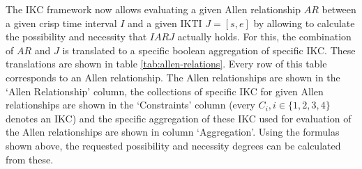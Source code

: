 


The IKC framework now allows evaluating a given Allen relationship $AR$ between a given crisp time interval $I$ and a given IKTI $J = \left[s, e\right]$ by allowing to calculate the possibility and necessity that $I AR J$ actually holds. For this, the combination of $AR$ and $J$ is translated to a specific boolean aggregation of specific IKC. These translations are shown in table \ref{tab:allen-relations}. Every row of this table corresponds to an Allen relationship. The Allen relationships are shown in the `Allen Relationship' column, the collections of specific IKC for given Allen relationships are shown in the `Constraints' column (every $C_i, i \in \{1, 2, 3, 4\}$ denotes an IKC) and the specific aggregation of these IKC used for evaluation of the Allen relationships are shown in column `Aggregation'. Using the formulas shown above, the requested possibility and necessity degrees can be calculated from these.





